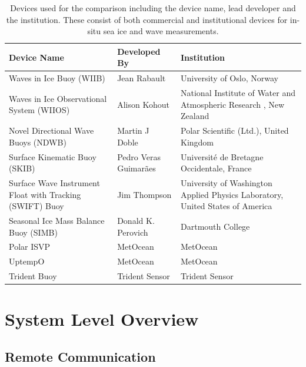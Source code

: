 \begin{center}{\setlength{\extrarowheight}{5pt}%
		\begin{longtable}[H]{|>{\RaggedRight}m{}|>{\RaggedRight}m{}| >{\RaggedRight}m{}|}
			\caption{Devices used for the comparison including the device name, lead developer and the institution. These consist of both commercial and institutional devices for in-situ sea ice and wave measurements.}\\
			\hline
			\label{tab:device_list}
			\textbf{Device Name} & \textbf{Developed By} & \textbf{Institution}\\
			\hline
			Waves in Ice Buoy (WIIB) & Jean Rabault & University of Oslo, Norway \cite{rabault2019open} \\
			\hline
			Waves in Ice Observational System (WIIOS) & Alison Kohout & National Institute of Water and Atmospheric Research \cite{kohout2015device}, New Zealand \\
			\hline
			Novel Directional Wave Buoys (NDWB) & Martin J Doble &  Polar Scientific (Ltd.), United Kingdom \cite{doble2017robust}\\
			\hline
			Surface Kinematic Buoy (SKIB) & Pedro Veras Guimarães & Université de Bretagne Occidentale, France \cite{guimaraes2018surface} \\
			\hline
			Surface Wave Instrument Float with Tracking (SWIFT) Buoy & Jim Thompson & University of Washington Applied Physics Laboratory, United States of America \cite{thomson2012wave}\\
			\hline
			Seasonal Ice Mass Balance Buoy (SIMB) & Donald K. Perovich & Dartmouth College \\
			\hline
			Polar ISVP & MetOcean & MetOcean \\
			\hline
			UptempO & MetOcean & MetOcean \\
			\hline
			Trident Buoy & Trident Sensor & Trident Sensor \\
			\hline
		\end{longtable}
	}
\end{center}


\section{System Level Overview}

\subsection{Remote Communication}
\label{ch2:sec_remote}

